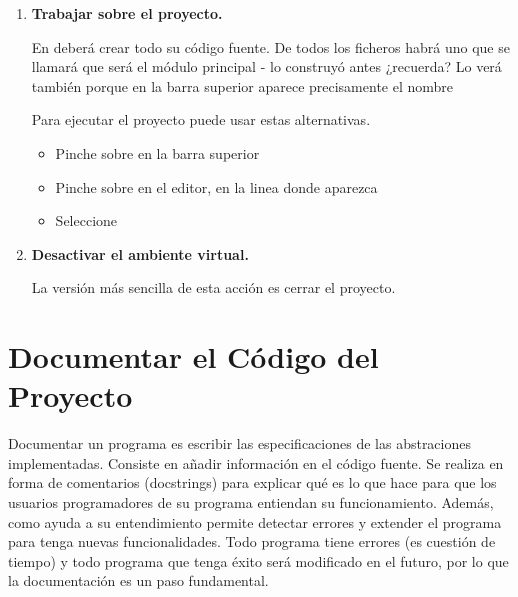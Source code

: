 \begin{enumerate}
\item \textbf{Trabajar sobre el proyecto.} 

En  deberá crear todo su código fuente. De todos los ficheros habrá uno que se llamará \mbox{} que será el módulo principal - lo construyó antes ¿recuerda? Lo verá también porque en la barra superior aparece precisamente el nombre 

Para ejecutar el proyecto puede usar estas alternativas.
	\begin{itemize}
	\item Pinche sobre \cmboxb[green!75]{\mbox{ $\blacktriangleright$ }} en la barra superior
	\item Pinche sobre \cmboxb[green!75]{\mbox{ $\blacktriangleright$ }} en el editor, en la linea donde aparezca 
	\item Seleccione 
	\end{itemize}
	
\item \textbf{Desactivar el ambiente virtual.} 

La versión más sencilla de esta acción es cerrar el proyecto.

\end{enumerate}



\section{Documentar el Código del Proyecto} %
\label{sec:documentarCodigo}

Documentar un programa es escribir las especificaciones de las abstraciones implementadas. Consiste en añadir información en el código fuente. Se realiza en forma de comentarios (docstrings) para explicar qué es lo que hace para que los usuarios programadores de su programa entiendan su funcionamiento. Además, como ayuda a su entendimiento permite detectar errores y extender el programa para tenga nuevas funcionalidades. Todo programa tiene errores (es cuestión de tiempo) y todo programa que tenga éxito será modificado en el futuro, por lo que la documentación es un paso fundamental.


